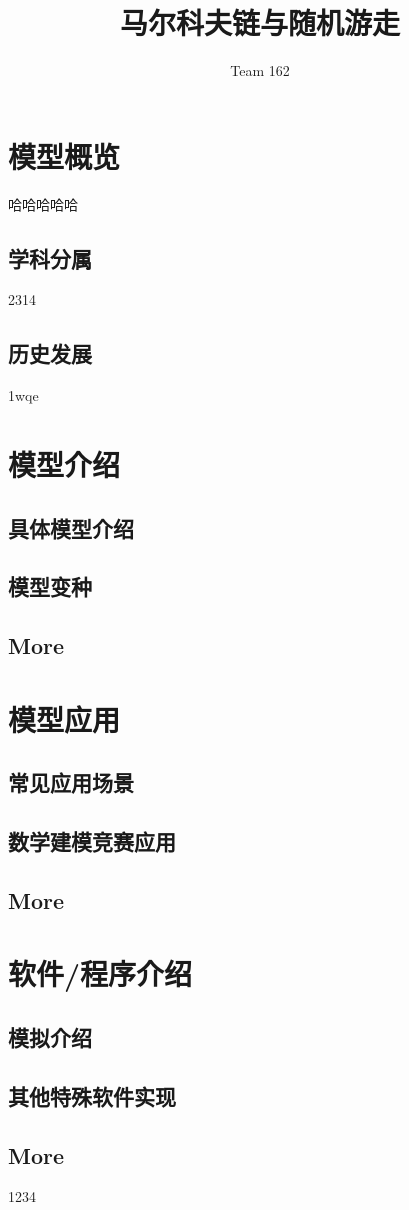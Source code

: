 \documentclass{ctexart}
\title{\textbf{马尔科夫链与随机游走}}
\author{Team 162}
\begin{document}
\maketitle
\tableofcontents
\section{模型概览}
哈哈哈哈哈
\subsection{学科分属}
2314
\subsection{历史发展}
1wqe
\section{模型介绍}

\subsection{具体模型介绍}

\subsection{模型变种}

\subsection{More}


\section{模型应用}

\subsection{常见应用场景}


\subsection{数学建模竞赛应用}

\subsection{More}



\section{软件/程序介绍}

\subsection{模拟介绍}

\subsection{其他特殊软件实现}

\subsection{More}



\begin{appendices}
1234
\end{appendices}
\end{document}
